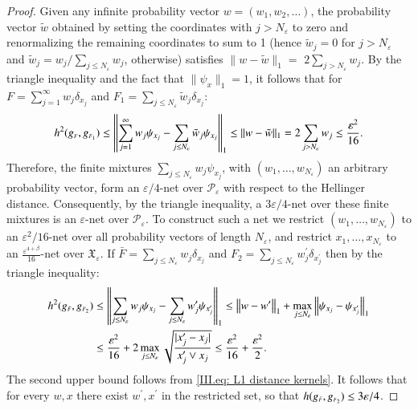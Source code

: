\begin{proof}
    Given any infinite probability vector $w=\left(w_1, w_2, \ldots\right)$, the probability vector $\tilde{w}$ obtained by setting the coordinates with $j>N_\varepsilon$ to zero and renormalizing the remaining coordinates to sum to 1 (hence $\tilde{w}_j=0$ for $j>N_\varepsilon$ and $\tilde{w}_j=w_j / \sum_{j \leq N_\varepsilon} w_j$, otherwise) satisfies $\|w-\tilde{w}\|_1=$ $2 \sum_{j>N_\varepsilon} w_j$. By the triangle inequality and the fact that $\|\psi_x\|_1=1$, it follows that for $F = \sum_{j=1}^{\infty} w_j \delta_{x_j}$ and $F_1 = \sum_{j\leq N_\varepsilon} \tilde{w}_j \delta_{x_j}$:
    $$
    h^2 (g_{\scriptscriptstyle{F}}, g_{\scriptscriptstyle{F_{\scaleto{1}{3.2pt}}}}) \leq \left\|\sum_{j=1}^{\infty} w_j \psi_{x_j}-\sum_{j \leq N_\varepsilon} \tilde{w}_j \psi_{x_j} \right\|_1 \leq\|w-\tilde{w}\|_1 = 2 \sum_{j>N_\varepsilon} w_j \leq \frac{\varepsilon^2}{16}.
    $$
    Therefore, the finite mixtures $\sum_{j\leq N_{\varepsilon}} w_j \psi_{x_j}$, with $\left(w_1, \ldots, w_{N_\varepsilon}\right)$ an arbitrary probability vector, form an $\varepsilon / 4$-net over $\mathcal{P}_\varepsilon$ with respect to the Hellinger distance. Consequently, by the triangle inequality, a $3 \varepsilon / 4$-net over these finite mixtures is an $\varepsilon$-net over $\mathcal{P}_\varepsilon$. To construct such a net we restrict $\left(w_1, \ldots, w_{N_\varepsilon}\right)$ to an $\varepsilon^2 / 16$-net over all probability vectors of length $N_\varepsilon$, and restrict $x_1,\ldots,x_{N_\varepsilon}$ to an $\frac{ \varepsilon^{4+\beta}}{16}$-net over $\mathfrak{X}_\varepsilon$. If $\bar{F} = \sum_{j \leq N_\varepsilon} w_j \delta_{x_j}$ and $F_2 = \sum_{j \leq N_\varepsilon} w^{\prime}_j \delta_{x^{\prime}_j}$ then by the triangle inequality:
    \begin{align*}
    h^2 (g_{\scriptscriptstyle{\bar{F}}}, g_{\scriptscriptstyle{F_{\scaleto{2}{3.2pt}}}}) & \leq  \left\|\sum_{j \leq N_\varepsilon} w_j \psi_{x_j}-\sum_{j \leq N_\varepsilon} w_j^{\prime} \psi_{x_j^{\prime}} \right\|_1 \leq\left\|w-w^{\prime}\right\|_1+\max _{j \leq N_\varepsilon}\left\|\psi_{x_j}-\psi_{x_j^{\prime}} \right\|_1  \\
    & \leq \frac{\varepsilon^2}{16} + 2 \max_{j \leq N_\varepsilon} \sqrt{\frac{|x^{\prime}_j - x_j|}{x^{\prime}_j \vee x_j}} \leq \frac{\varepsilon^2}{16} + \frac{ \varepsilon^2}{2}.
    \end{align*}
    The second upper bound follows from \eqref{III.eq: L1 distance kernels}. It follows that for every $w, x$ there exist $w^{\prime}, x^{\prime}$ in the restricted set, so that $h (g_{\scriptscriptstyle{\bar{F}}}, g_{\scriptscriptstyle{F_{\scaleto{2}{3.2pt}}}}) \leq 3 \varepsilon / 4$.  

\end{proof}
